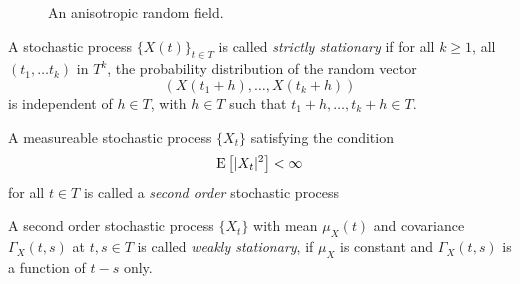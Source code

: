 

\begin{figure}
    \vspace{-20pt}
    
    \caption{An anisotropic random field.}
    \label{fig:ranom_field_anisotropic}
\end{figure}



\begin{definition}

    A stochastic process \( \{X(t)\}_{t \in T} \) is called \textit{strictly stationary} if for all \( k \geq 1 \), all \( (t_{1}, \dots t_{k}) \) in \( T^{k} \), the probability distribution of the random vector 
    \[
        (X(t_{1}+h), \dots, X(t_{k}+h))
    \]
    is independent of \( h \in T \), with \( h \in T \) such that \( t_{1}+h, \dots, t_{k}+h \in T\).
\end{definition}
%
\begin{definition}
    A measureable stochastic process \(\{X_{t}\}\) satisfying the condition
    \[
        \operatorname*{E}\left[ \lvert X_{t} \rvert^2 \right] < \infty
    \]
    for all $t \in T$ is called a \textit{second order} stochastic process
\end{definition}
%
\begin{definition}
    A second order stochastic process \(\{X_{t}\}\) with mean \(\mu_{X}(t)\) and covariance \( \Gamma_{X}(t,s) \) at \( t,s \in T \) is called \textit{weakly stationary}, if \( \mu_{X} \) is constant and \( \Gamma_{X}(t,s) \) is a function of \( t-s \) only.
\end{definition}

